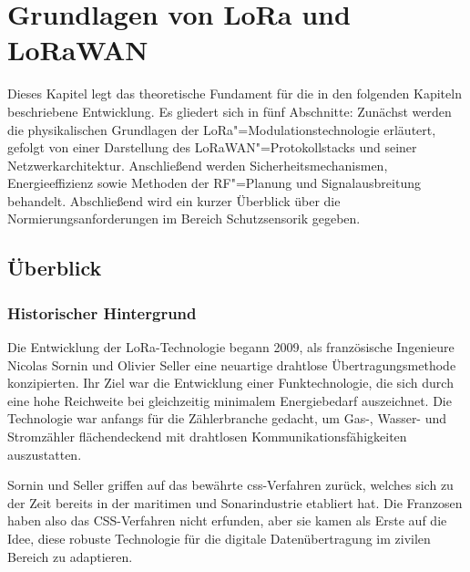 
\chapter{Grundlagen von LoRa und LoRaWAN}
\label{chap:grundlagen}
Dieses Kapitel legt das theoretische Fundament für die in den folgenden Kapiteln
beschriebene Entwicklung. Es gliedert sich in fünf Abschnitte: Zunächst werden die
physikalischen Grundlagen der LoRa"=Modulationstechnologie erläutert, gefolgt von
einer Darstellung des LoRaWAN"=Protokollstacks und seiner Netzwerkarchitektur.
Anschließend werden Sicherheitsmechanismen, Energieeffizienz sowie Methoden der
RF"=Planung und Signalausbreitung behandelt. Abschließend wird ein kurzer Überblick
über die Normierungsanforderungen im Bereich Schutzsensorik gegeben.

\section{Überblick}

\subsection{Historischer Hintergrund}

Die Entwicklung der LoRa-Technologie begann 2009, als französische Ingenieure Nicolas Sornin und Olivier Seller eine neuartige 
drahtlose Übertragungsmethode konzipierten. Ihr Ziel war die Entwicklung einer Funktechnologie, die sich durch eine 
hohe Reichweite bei gleichzeitig minimalem Energiebedarf auszeichnet. Die Technologie war anfangs für die Zählerbranche 
gedacht, um Gas-, Wasser- und Stromzähler flächendeckend mit drahtlosen Kommunikationsfähigkeiten auszustatten. \cite{slatsBriefHistoryLoRa}

Sornin und Seller griffen auf das bewährte \acrfull{css}-Verfahren zurück, welches sich zu der Zeit bereits in der
maritimen und Sonarindustrie etabliert hat. Die Franzosen haben also das CSS-Verfahren nicht erfunden, aber sie kamen als Erste auf die Idee,
diese robuste Technologie für die digitale Datenübertragung im zivilen Bereich zu adaptieren.

